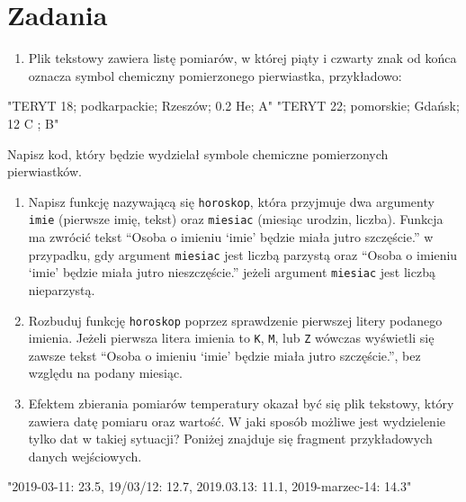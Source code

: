 \documentclass[paper=6in:9in,pagesize=pdftex,headinclude=on,footinclude=on,10pt]{scrbook}
\newenvironment{Shaded}{\begin{snugshade}}{\end{snugshade}}
\newcommand{\StringTok}[1]{\textcolor[rgb]{0.31,0.60,0.02}{#1}}
\providecommand{\tightlist}{%
  \setlength{\itemsep}{0pt}\setlength{\parskip}{0pt}}
\begin{document}
\hypertarget{zadania}{%
\section{Zadania}\label{zadania}}

\begin{enumerate}
\def\labelenumi{\arabic{enumi})}
\tightlist
\item
  Plik tekstowy zawiera listę pomiarów, w której piąty i czwarty znak od końca oznacza symbol chemiczny pomierzonego pierwiastka, przykładowo:
\end{enumerate}

\begin{Shaded}
\begin{Highlighting}[]
\StringTok{"TERYT 18; podkarpackie; Rzeszów; 0.2 He; A"}
\StringTok{"TERYT 22; pomorskie;	Gdańsk; 12 C ; B"}
\end{Highlighting}
\end{Shaded}

Napisz kod, który będzie wydzielał symbole chemiczne pomierzonych pierwiastków.

\begin{enumerate}
\def\labelenumi{\arabic{enumi})}
\setcounter{enumi}{1}
\tightlist
\item
  Napisz funkcję nazywającą się \texttt{horoskop}, która przyjmuje dwa argumenty \texttt{imie} (pierwsze imię, tekst) oraz \texttt{miesiac} (miesiąc urodzin, liczba).
  Funkcja ma zwrócić tekst ``Osoba o imieniu `imie' będzie miała jutro szczęście.'' w przypadku, gdy argument \texttt{miesiac} jest liczbą parzystą oraz ``Osoba o imieniu `imie' będzie miała jutro nieszczęście.'' jeżeli argument \texttt{miesiac} jest liczbą nieparzystą.
\item
  Rozbuduj funkcję \texttt{horoskop} poprzez sprawdzenie pierwszej litery podanego imienia. Jeżeli pierwsza litera imienia to \texttt{K}, \texttt{M}, lub \texttt{Z} wówczas wyświetli się zawsze tekst ``Osoba o imieniu `imie' będzie miała jutro szczęście.'', bez względu na podany miesiąc.
\item
  Efektem zbierania pomiarów temperatury okazał być się plik tekstowy, który zawiera datę pomiaru oraz wartość.
  W jaki sposób możliwe jest wydzielenie tylko dat w takiej sytuacji?
  Poniżej znajduje się fragment przykładowych danych wejściowych.
\end{enumerate}

\begin{Shaded}
\begin{Highlighting}[]
\StringTok{"2019-03-11: 23.5, 19/03/12: 12.7, 2019.03.13: 11.1, 2019-marzec-14: 14.3"}
\end{Highlighting}
\end{Shaded}
\end{document}
